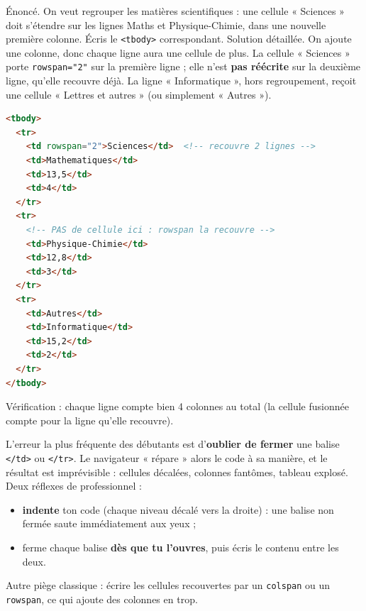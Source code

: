 \documentclass[11pt]{article}
\begin{document}
\begin{exoresolu}
\'Enonc\'e. On veut regrouper les mati\`eres scientifiques : une cellule « Sciences » doit s'\'etendre sur les lignes Maths et Physique-Chimie, dans une nouvelle premi\`ere colonne. \'Ecris le \texttt{<tbody>} correspondant.
\tcblower
Solution d\'etaill\'ee. On ajoute une colonne, donc chaque ligne aura une cellule de plus. La cellule « Sciences » porte \texttt{rowspan="2"} sur la premi\`ere ligne ; elle n'est \textbf{pas r\'e\'ecrite} sur la deuxi\`eme ligne, qu'elle recouvre d\'ej\`a. La ligne « Informatique », hors regroupement, re\c{c}oit une cellule « Lettres et autres » (ou simplement « Autres »).
\begin{lstlisting}[language=HTML]
<tbody>
  <tr>
    <td rowspan="2">Sciences</td>  <!-- recouvre 2 lignes -->
    <td>Mathematiques</td>
    <td>13,5</td>
    <td>4</td>
  </tr>
  <tr>
    <!-- PAS de cellule ici : rowspan la recouvre -->
    <td>Physique-Chimie</td>
    <td>12,8</td>
    <td>3</td>
  </tr>
  <tr>
    <td>Autres</td>
    <td>Informatique</td>
    <td>15,2</td>
    <td>2</td>
  </tr>
</tbody>
\end{lstlisting}
V\'erification : chaque ligne compte bien 4 colonnes au total (la cellule fusionn\'ee compte pour la ligne qu'elle recouvre).
\end{exoresolu}

\begin{attention}
L'erreur la plus fr\'equente des d\'ebutants est d'\textbf{oublier de fermer} une balise \texttt{</td>} ou \texttt{</tr>}. Le navigateur « r\'epare » alors le code \`a sa mani\`ere, et le r\'esultat est impr\'evisible : cellules d\'ecal\'ees, colonnes fant\^omes, tableau explos\'e. Deux r\'eflexes de professionnel :
\begin{itemize}
  \item \textbf{indente} ton code (chaque niveau d\'ecal\'e vers la droite) : une balise non ferm\'ee saute imm\'ediatement aux yeux ;
  \item ferme chaque balise \textbf{d\`es que tu l'ouvres}, puis \'ecris le contenu entre les deux.
\end{itemize}
Autre pi\`ege classique : \'ecrire les cellules recouvertes par un \texttt{colspan} ou un \texttt{rowspan}, ce qui ajoute des colonnes en trop.
\end{attention}
\end{document}
